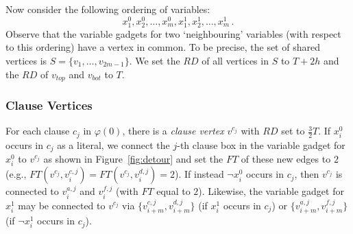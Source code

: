 \documentclass[envcountsame]{llncs}
\begin{document}
Now consider the following ordering of variables:
\[
x_1^0, x_2^0, \ldots, x_m^0, x_1^1, x_2^1, \ldots, x_m^1 \,.
\]
Observe that the variable gadgets for two `neighbouring' variables (with respect to this ordering) have a vertex in common.
To be precise, the set of shared vertices is $S = \{v_1, \ldots, v_{2m-1}\}$.
We set the $\mathit{RD}$ of all vertices in $S$ to $T + 2h$ and the $\mathit{RD}$ of
$v_{top}$ and $v_{bot}$ to $T$. 

\subsubsection{Clause Vertices}

For each clause $c_j$ in $\varphi(0)$, there is a \emph{clause vertex} $v^{c_j}$
with $\mathit{RD}$ set to $\frac{3}{2}T$.
If $x_i^0$ occurs in $c_j$ as a literal, we connect the $j$-th clause box in the variable gadget for $x_i^0$
to $v^{c_j}$ as shown in Figure~\ref{fig:detour} and set the $\mathit{FT}$ of these new edges to $2$
(e.g., $\mathit{FT}(v^{c_j}, v_i^{c, j}) = \mathit{FT}(v^{c_j}, v_i^{d, j}) = 2$). 
If instead $\neg x_i^0$ occurs in $c_j$, then $v^{c_j}$ is connected to $v_i^{a, j}$ and $v_i^{f, j}$
(with $\mathit{FT}$ equal to $2$). Likewise, the variable gadget for $x_i^1$ may be connected to
$v^{c_j}$ via $\{v_{i+m}^{c, j}, v_{i+m}^{d, j}\}$ (if $x_i^1$ occurs in $c_j$)
or $\{v_{i+m}^{a, j}, v_{i+m}^{f, j}\}$ (if $\neg x_i^1$ occurs in $c_j$).
\end{document}

